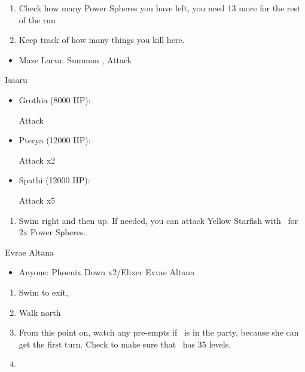 \begin{enumerate}[resume]
	\item Check how many Power Spheres you have left, you need 13 more for the rest of the run
	\item Keep track of how many things you kill here.
\end{enumerate}
\begin{encounters}
\begin{itemize}
	\item Maze Larva: Summon \ixilon, Attack
\end{itemize}
\end{encounters}
\begin{battle}{Isaaru}
\begin{itemize}
	\item Grothia (8000 HP):
	\begin{itemize}
		\summon{\bahamut}
		\bahamutf Attack
	\end{itemize}
	\item Pterya (12000 HP):
	\begin{itemize}
		\summon{\bahamut}
		\bahamutf Attack x2
	\end{itemize}
	\item Spathi (12000 HP):
	\begin{itemize}
		\summon{\ixilon}
		\ixilonf Attack x5
	\end{itemize}
\end{itemize}
\end{battle}
\begin{enumerate}[resume]
	\item Swim right and then up. If needed, you can attack Yellow Starfish with \tidus\ for 2x Power Spheres.
\end{enumerate}
\begin{battle}{Evrae Altana}
\begin{itemize}
	\item Anyone: Phoenix Down x2/Elixer Evrae Altana
\end{itemize}
\end{battle}
\begin{enumerate}[resume]
	\item Swim to exit, \sd
	\item Walk north
	\item From this point on, watch any pre-empts if \yuna\ is in the party, because she can get the first turn. Check to make sure that \lulu\ has 35 levels.
	\item \formation{\tidus}{\yuna}{\auron}
\end{enumerate}
